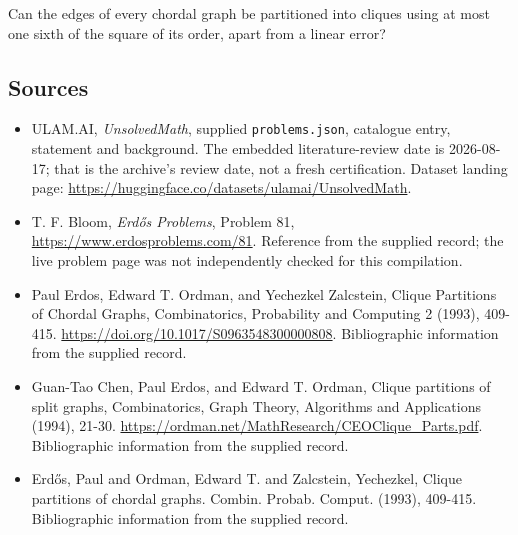 \documentclass[11pt,a4paper]{article}
\begin{document}
Can the edges of every chordal graph be partitioned into cliques using at most one sixth of the square of its order, apart from a linear error?

\subsection{Sources}

{\small

\begin{itemize}

\item[\hypertarget{source:statement:1}{S1}] ULAM.AI, \emph{UnsolvedMath}, supplied \texttt{problems.json}, catalogue entry, statement and background. The embedded literature-review date is 2026-08-17; that is the archive’s review date, not a fresh certification. Dataset landing page: \url{https://huggingface.co/datasets/ulamai/UnsolvedMath}.

\item[\hypertarget{source:statement:2}{S2}] T. F. Bloom, \emph{Erdős Problems}, Problem 81, \url{https://www.erdosproblems.com/81}. Reference from the supplied record; the live problem page was not independently checked for this compilation.

\item[\hypertarget{source:statement:3}{S3}] Paul Erdos, Edward T. Ordman, and Yechezkel Zalcstein, Clique Partitions of Chordal Graphs, Combinatorics, Probability and Computing 2 (1993), 409-415. \url{https://doi.org/10.1017/S0963548300000808}. Bibliographic information from the supplied record.

\item[\hypertarget{source:statement:4}{S4}] Guan-Tao Chen, Paul Erdos, and Edward T. Ordman, Clique partitions of split graphs, Combinatorics, Graph Theory, Algorithms and Applications (1994), 21-30. \url{https://ordman.net/MathResearch/CEOClique_Parts.pdf}. Bibliographic information from the supplied record.

\item[\hypertarget{source:statement:5}{S5}] Erd\H{o}s, Paul and Ordman, Edward T. and Zalcstein, Yechezkel, Clique partitions of chordal graphs. Combin. Probab. Comput. (1993), 409-415. Bibliographic information from the supplied record.

\end{itemize}

}

\label{end:statement}
\end{document}
